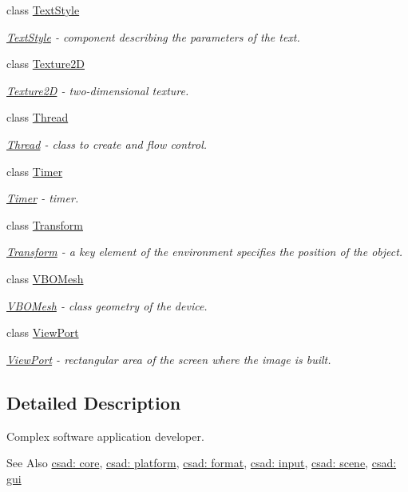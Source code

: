 \begin{DoxyCompactItemize}
class \hyperlink{classcsad_1_1_text_style}{Text\-Style}
\begin{DoxyCompactList}\small\item\em \hyperlink{classcsad_1_1_text_style}{Text\-Style} -\/ component describing the parameters of the text. \end{DoxyCompactList}\item 
class \hyperlink{classcsad_1_1_texture2_d}{Texture2\-D}
\begin{DoxyCompactList}\small\item\em \hyperlink{classcsad_1_1_texture2_d}{Texture2\-D} -\/ two-\/dimensional texture. \end{DoxyCompactList}\item 
class \hyperlink{classcsad_1_1_thread}{Thread}
\begin{DoxyCompactList}\small\item\em \hyperlink{classcsad_1_1_thread}{Thread} -\/ class to create and flow control. \end{DoxyCompactList}\item 
class \hyperlink{classcsad_1_1_timer}{Timer}
\begin{DoxyCompactList}\small\item\em \hyperlink{classcsad_1_1_timer}{Timer} -\/ timer. \end{DoxyCompactList}\item 
class \hyperlink{classcsad_1_1_transform}{Transform}
\begin{DoxyCompactList}\small\item\em \hyperlink{classcsad_1_1_transform}{Transform} -\/ a key element of the environment specifies the position of the object. \end{DoxyCompactList}\item 
class \hyperlink{classcsad_1_1_v_b_o_mesh}{V\-B\-O\-Mesh}
\begin{DoxyCompactList}\small\item\em \hyperlink{classcsad_1_1_v_b_o_mesh}{V\-B\-O\-Mesh} -\/ class geometry of the device. \end{DoxyCompactList}\item 
class \hyperlink{classcsad_1_1_view_port}{View\-Port}
\begin{DoxyCompactList}\small\item\em \hyperlink{classcsad_1_1_view_port}{View\-Port} -\/ rectangular area of the screen where the image is built. \end{DoxyCompactList}\end{DoxyCompactItemize}


\subsection{Detailed Description}
Complex software application developer. \begin{DoxySeeAlso}{See Also}
\hyperlink{group__core}{csad\-: core}, \hyperlink{group__platform}{csad\-: platform}, \hyperlink{group__format}{csad\-: format}, \hyperlink{group__input}{csad\-: input}, \hyperlink{group__scene}{csad\-: scene}, \hyperlink{group__scenegui}{csad\-: gui} 
\end{DoxySeeAlso}
